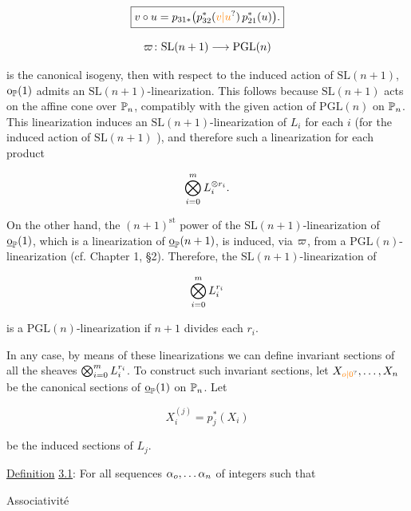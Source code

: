 \[
\boxed{v\circ u=p_{31*}\bigl(p_{32}^{*}(\unsure{v|u})\,p_{21}^{*}(u)\bigr).}
\]



\[
\varpi\colon\mathrm{SL}(n+1)\longrightarrow\mathrm{PGL}(n)
\]

is the canonical isogeny, then with respect to the induced action of $\mathrm{SL}(n+1)$, $\mathrm{o}_{\mathbb P}(1)$ admits an $\mathrm{SL}(n+1)$-linearization. This follows because $\mathrm{SL}(n+1)$ acts on the affine cone over $\mathbb P_n$, compatibly with the given action of $\mathrm{PGL}(n)$ on $\mathbb P_n$. This linearization induces an $\mathrm{SL}(n+1)$-linearization of $L_i$ for each $i$ (for the induced action of $\mathrm{SL}(n+1)$ ), and therefore such a linearization for each product

\[
\bigotimes_{i=0}^{m} L_i^{\otimes r_i}.
\]

On the other hand, the $(n+1)^{\mathrm{st}}$ power of the $\mathrm{SL}(n+1)$-linearization of $\underline{\mathrm{o}}_{\mathbb P}(1)$, which is a linearization of $\underline{\mathrm{o}}_{\mathbb P}(n+1)$, is induced, via $\varpi$, from a $\mathrm{PGL}(n)$-linearization (cf. Chapter 1, \S2). Therefore, the $\mathrm{SL}(n+1)$-linearization of

\[
\bigotimes_{i=0}^{m} L_i^{r_i}
\]

is a $\mathrm{PGL}(n)$-linearization if $n+1$ divides each $r_i$.

In any case, by means of these linearizations we can define invariant sections of all the sheaves $\bigotimes_{i=0}^{m} L_i^{r_i}$. To construct such invariant sections, let $X_{\unsure{o|0}},\ldots,X_n$ be the canonical sections of $\underline{\mathrm{o}}_{\mathbb P}(1)$ on $\mathbb P_n$. Let

\[
X_i^{(j)}=p_j^*(X_i)
\]

be the induced sections of $L_j$.

\uline{Definition} \uline{3.1}: For all sequences $\alpha_o,\ldots\alpha_n$ of integers such that

Associativité

